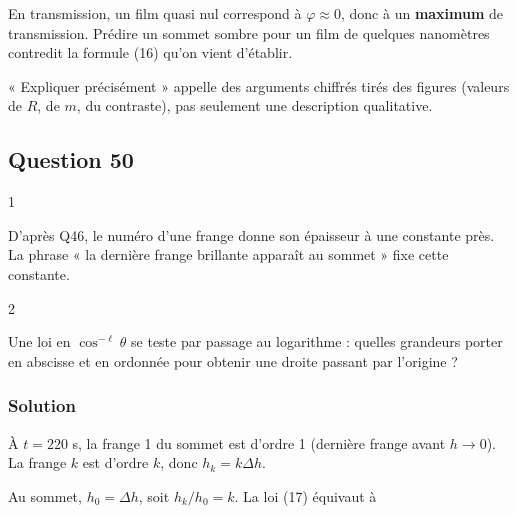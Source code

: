 \documentclass[11pt,a4paper]{article}
\newcommand{\equationajustee}[1]{%
  \sbox{\boiteequation}{$\displaystyle #1$}%
  \ifdim\wd\boiteequation>\linewidth
    \[\resizebox{\linewidth}{!}{\usebox{\boiteequation}}\]%
  \else
    \[#1\]%
  \fi}
\begin{document}
\begin{piege}

En transmission, un film quasi nul correspond à \(\varphi\approx0\), donc à un \textbf{maximum} de transmission. Prédire un sommet sombre pour un film de quelques nanomètres contredit la formule (16) qu'on vient d'établir.

\end{piege}

\begin{jury}

« Expliquer précisément » appelle des arguments chiffrés tirés des figures (valeurs de \(R\), de \(m\), du contraste), pas seulement une description qualitative.

\end{jury}

\hypertarget{question-50}{%
\subsection{Question 50}\label{question-50}}

\begin{indication}{1}

D'après Q46, le numéro d'une frange donne son épaisseur à une constante près. La phrase « la dernière frange brillante apparaît au sommet » fixe cette constante.

\end{indication}

\begin{indication}{2}

Une loi en \(\cos^{-\ell}\theta\) se teste par passage au logarithme : quelles grandeurs porter en abscisse et en ordonnée pour obtenir une droite passant par l'origine ?

\end{indication}

\hypertarget{solution-49}{%
\subsubsection{Solution}\label{solution-49}}

À \(t=220\) s, la frange 1 du sommet est d'ordre 1 (dernière frange avant \(h\to0\)). La frange \(k\) est d'ordre \(k\), donc \(h_k=k\Delta h\).

Au sommet, \(h_0=\Delta h\), soit \(h_k/h_0=k\). La loi (17) équivaut à

\equationajustee{\ln k=\ell\,\big[-\ln\cos\theta_k\big].}
\end{document}
